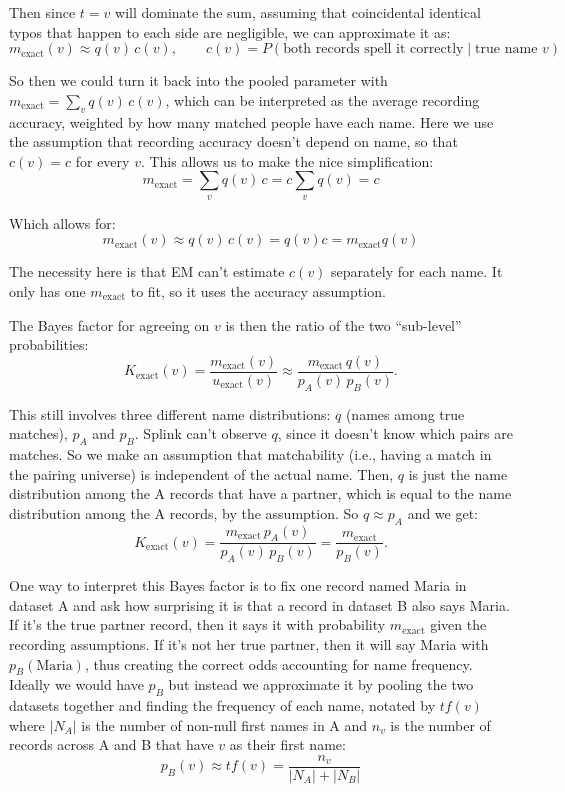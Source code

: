 \documentclass[11pt]{article}
\begin{document}
Then since $t=v$ will dominate the sum, assuming that coincidental identical typos that happen to each side are negligible, we can approximate it as:
\[
m_{\text{exact}}(v) \approx q(v)\, c(v), \qquad c(v) = P(\text{both records spell it correctly} \mid \text{true name } v)
\]

So then we could turn it back into the pooled parameter with $m_{\text{exact}} = \sum_v q(v)\, c(v)$, which can be interpreted as the average recording accuracy, weighted by how many matched people have each name. Here we use the assumption that recording accuracy doesn't depend on name, so that $c(v) = c$ for every $v$. This allows us to make the nice simplification:
\[
m_{\text{exact}} = \sum_v q(v)\,c = c\sum_v q(v) = c
\]

Which allows for:
\[
m_{\text{exact}}(v) \approx q(v)\, c(v) = q(v) c = m_\text{exact}q(v)
\]

The necessity here is that EM can't estimate $c(v)$ separately for each name. It only has one $m_{\text{exact}}$ to fit, so it uses the accuracy assumption.

The Bayes factor for agreeing on $v$ is then the ratio of the two ``sub-level'' probabilities:
\[
K_{\text{exact}}(v) = \frac{m_{\text{exact}}(v)}{u_{\text{exact}}(v)} \approx \frac{m_{\text{exact}}\,q(v)}{p_A(v)\,p_B(v)}.
\]

This still involves three different name distributions: $q$ (names among true matches), $p_A$ and $p_B$. Splink can't observe $q$, since it doesn't know which pairs are matches. So we make an assumption that matchability (i.e., having a match in the pairing universe) is independent of the actual name. Then, $q$ is just the name distribution among the A records that have a partner, which is equal to the name distribution among the A records, by the assumption. So $q \approx p_A$ and we get:
\[
K_{\text{exact}}(v) = \frac{m_{\text{exact}}\,p_A(v)}{p_A(v)\,p_B(v)} = \frac{m_{\text{exact}}}{p_B(v)}.
\]

One way to interpret this Bayes factor is to fix one record named Maria in dataset A and ask how surprising it is that a record in dataset B also says Maria. If it's the true partner record, then it says it with probability $m_\text{exact}$ given the recording assumptions. If it's not her true partner, then it will say Maria with $p_B(\text{Maria})$, thus creating the correct odds accounting for name frequency. Ideally we would have $p_B$ but instead we approximate it by pooling the two datasets together and finding the frequency of each name, notated by $tf(v)$ where $|N_A|$ is the number of non-null first names in A and $n_v$ is the number of records across A and B that have $v$ as their first name:
\[
p_B(v) \approx tf(v) = \frac{n_v}{|N_A| + |N_B|}
\]
\end{document}
